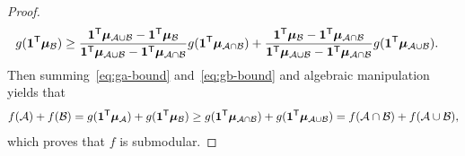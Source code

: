 \begin{proof}
\begin{align}
  \label{eq:gb-bound}
    g(\bm{1}^{\mathsf{T}}\bm{\mu}_{\mathcal{B}})
    &\ge
      \frac{\bm{1}^{\mathsf{T}}\bm{\mu}_{\mathcal{A} \cup \mathcal{B}} - \bm{1}^{\mathsf{T}}\bm{\mu}_{\mathcal{B}}}{\bm{1}^{\mathsf{T}}\bm{\mu}_{\mathcal{A} \cup \mathcal{B}} - \bm{1}^{\mathsf{T}}\bm{\mu}_{\mathcal{A} \cap \mathcal{B}}} g(\bm{1}^{\mathsf{T}}\bm{\mu}_{\mathcal{A} \cap \mathcal{B}}) + 
      \frac{\bm{1}^{\mathsf{T}}\bm{\mu}_{\mathcal{B}} - \bm{1}^{\mathsf{T}}\bm{\mu}_{\mathcal{A} \cap \mathcal{B}}}{\bm{1}^{\mathsf{T}}\bm{\mu}_{\mathcal{A} \cup \mathcal{B}} - \bm{1}^{\mathsf{T}}\bm{\mu}_{\mathcal{A} \cap \mathcal{B}}} g(\bm{1}^{\mathsf{T}}\bm{\mu}_{\mathcal{A} \cup \mathcal{B}}).
  \end{align}
  Then summing~\eqref{eq:ga-bound} and~\eqref{eq:gb-bound} and algebraic manipulation yields that 
  \begin{equation} \label{eq:submod-proof-cond}
    f(\mathcal{A}) + f(\mathcal{B})
    = g(\bm{1}^{\mathsf{T}}\bm{\mu}_{\mathcal{A}}) + g(\bm{1}^{\mathsf{T}}\bm{\mu}_{\mathcal{B}})
    \ge
      g(\bm{1}^{\mathsf{T}}\bm{\mu}_{\mathcal{A} \cap \mathcal{B}}) + 
      g(\bm{1}^{\mathsf{T}}\bm{\mu}_{\mathcal{A} \cup \mathcal{B}})
     = 
      f(\mathcal{A} \cap \mathcal{B}) + 
      f(\mathcal{A} \cup \mathcal{B}),
\end{equation}
    which proves that $f$ is submodular. 
\end{proof}



